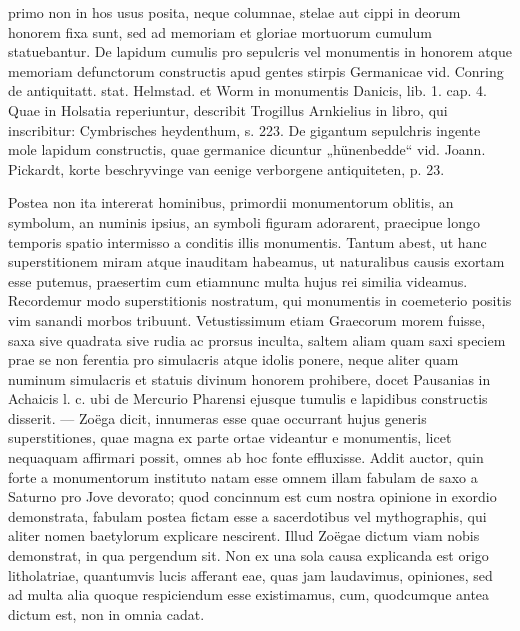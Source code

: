 \documentclass[a4paper, 11pt, oneside, polutonikogreek, german]{article}
\begin{document}
primo non in hos usus posita, neque columnae, stelae aut cippi in deorum honorem fixa sunt, sed ad memoriam et gloriae mortuorum cumulum statuebantur. De lapidum cumulis pro sepulcris vel monumentis in honorem atque memoriam defunctorum constructis apud gentes stirpis Germanicae vid. Conring de antiquitatt. stat. Helmstad. et Worm in monumentis Danicis, lib. 1. cap. 4. Quae in Holsatia reperiuntur, describit Trogillus Arnkielius in libro, qui inscribitur: Cymbrisches heydenthum, s. 223. De gigantum sepulchris ingente mole lapidum constructis, quae germanice dicuntur „hünenbedde“ vid. Joann. Pickardt, korte beschryvinge van eenige verborgene antiquiteten, p. 23.

Postea non ita intererat hominibus, primordii monumentorum oblitis, an symbolum, an numinis ipsius, an symboli figuram adorarent, praecipue longo temporis spatio intermisso a conditis illis monumentis. Tantum abest, ut hanc superstitionem miram atque inauditam habeamus, ut naturalibus causis exortam esse putemus, praesertim cum etiamnunc multa hujus rei similia videamus. Recordemur modo superstitionis nostratum, qui monumentis in coemeterio positis vim sanandi morbos tribuunt. Vetustissimum etiam Graecorum morem fuisse, saxa sive quadrata sive rudia ac prorsus inculta, saltem aliam quam saxi speciem prae se non ferentia pro simulacris atque idolis ponere, neque aliter quam numinum simulacris et statuis divinum honorem prohibere, docet Pausanias in Achaicis l. c. ubi de Mercurio Pharensi ejusque tumulis e lapidibus constructis disserit. --- Zoëga dicit, innumeras esse quae occurrant hujus generis superstitiones, quae magna ex parte ortae videantur e monumentis, licet nequaquam affirmari possit, omnes ab hoc fonte effluxisse. Addit auctor, quin forte a monumentorum instituto natam esse omnem illam fabulam de saxo a Saturno pro Jove devorato; quod concinnum est cum nostra opinione in exordio demonstrata, fabulam postea fictam esse a sacerdotibus vel mythographis, qui aliter nomen baetylorum explicare nescirent. Illud Zoëgae dictum viam nobis demonstrat, in qua pergendum sit. Non ex una sola causa explicanda est origo litholatriae, quantumvis lucis afferant eae, quas jam laudavimus, opiniones, sed ad multa alia quoque respiciendum esse existimamus, cum, quodcumque antea dictum est, non in omnia cadat.
\end{document}

